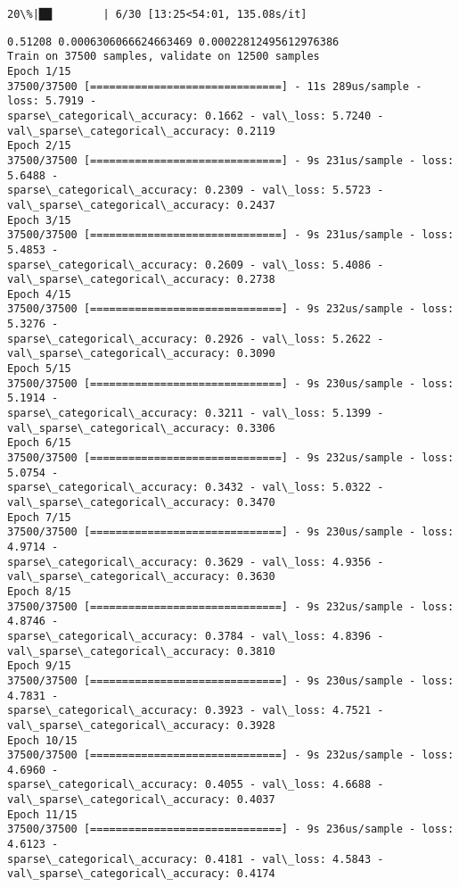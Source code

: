 \documentclass[11pt]{article}
\begin{document}
    \begin{Verbatim}[commandchars=\\\{\}]
 20\%|██        | 6/30 [13:25<54:01, 135.08s/it]
    \end{Verbatim}

    \begin{Verbatim}[commandchars=\\\{\}]
0.51208 0.0006306066624663469 0.00022812495612976386
Train on 37500 samples, validate on 12500 samples
Epoch 1/15
37500/37500 [==============================] - 11s 289us/sample - loss: 5.7919 -
sparse\_categorical\_accuracy: 0.1662 - val\_loss: 5.7240 -
val\_sparse\_categorical\_accuracy: 0.2119
Epoch 2/15
37500/37500 [==============================] - 9s 231us/sample - loss: 5.6488 -
sparse\_categorical\_accuracy: 0.2309 - val\_loss: 5.5723 -
val\_sparse\_categorical\_accuracy: 0.2437
Epoch 3/15
37500/37500 [==============================] - 9s 231us/sample - loss: 5.4853 -
sparse\_categorical\_accuracy: 0.2609 - val\_loss: 5.4086 -
val\_sparse\_categorical\_accuracy: 0.2738
Epoch 4/15
37500/37500 [==============================] - 9s 232us/sample - loss: 5.3276 -
sparse\_categorical\_accuracy: 0.2926 - val\_loss: 5.2622 -
val\_sparse\_categorical\_accuracy: 0.3090
Epoch 5/15
37500/37500 [==============================] - 9s 230us/sample - loss: 5.1914 -
sparse\_categorical\_accuracy: 0.3211 - val\_loss: 5.1399 -
val\_sparse\_categorical\_accuracy: 0.3306
Epoch 6/15
37500/37500 [==============================] - 9s 232us/sample - loss: 5.0754 -
sparse\_categorical\_accuracy: 0.3432 - val\_loss: 5.0322 -
val\_sparse\_categorical\_accuracy: 0.3470
Epoch 7/15
37500/37500 [==============================] - 9s 230us/sample - loss: 4.9714 -
sparse\_categorical\_accuracy: 0.3629 - val\_loss: 4.9356 -
val\_sparse\_categorical\_accuracy: 0.3630
Epoch 8/15
37500/37500 [==============================] - 9s 232us/sample - loss: 4.8746 -
sparse\_categorical\_accuracy: 0.3784 - val\_loss: 4.8396 -
val\_sparse\_categorical\_accuracy: 0.3810
Epoch 9/15
37500/37500 [==============================] - 9s 230us/sample - loss: 4.7831 -
sparse\_categorical\_accuracy: 0.3923 - val\_loss: 4.7521 -
val\_sparse\_categorical\_accuracy: 0.3928
Epoch 10/15
37500/37500 [==============================] - 9s 232us/sample - loss: 4.6960 -
sparse\_categorical\_accuracy: 0.4055 - val\_loss: 4.6688 -
val\_sparse\_categorical\_accuracy: 0.4037
Epoch 11/15
37500/37500 [==============================] - 9s 236us/sample - loss: 4.6123 -
sparse\_categorical\_accuracy: 0.4181 - val\_loss: 4.5843 -
val\_sparse\_categorical\_accuracy: 0.4174

\end{Verbatim}
\end{document}
